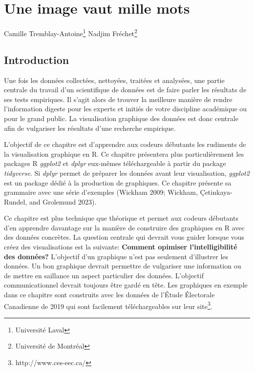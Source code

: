 \documentclass[
  letterpaper,
]{scrbook}
\begin{document}

\hypertarget{une-image-vaut-mille-mots}{%
\chapter{Une image vaut mille mots}\label{une-image-vaut-mille-mots}}

Camille Tremblay-Antoine\footnote{Université Laval} Nadjim
Fréchet\footnote{Université de Montréal}

\hypertarget{introduction-1}{%
\section{Introduction}\label{introduction-1}}

Une fois les données collectées, nettoyées, traitées et analysées, une
partie centrale du travail d'un scientifique de données est de faire
parler les résultats de ses tests empiriques. Il s'agit alors de trouver
la meilleure manière de rendre l'information digeste pour les experts et
initiés de votre discipline académique ou pour le grand public. La
visualisation graphique des données est donc centrale afin de vulgariser
les résultats d'une recherche empirique.

L'objectif de ce chapitre est d'apprendre aux codeurs débutants les
rudiments de la visualisation graphique en R. Ce chapitre présentera
plus particulièrement les packages R \emph{ggplot2} et \emph{dplyr}
eux-mêmes téléchargeable à partir du package \emph{tidyverse}. Si
\emph{dplyr} permet de préparer les données avant leur visualisation,
\emph{ggplot2} est un package dédié à la production de graphiques. Ce
chapitre présente sa grammaire avec une série d'exemples (Wickham 2009;
Wickham, Çetinkaya-Rundel, and Grolemund 2023).

Ce chapitre est plus technique que théorique et permet aux codeurs
débutants d'en apprendre davantage sur la manière de construire des
graphiques en R avec des données concrètes. La question centrale qui
devrait vous guider lorsque vous créez des visualisations est la
suivante: \textbf{Comment opimiser l'intelligibilité des données?}
L'objectif d'un graphique n'est pas seulement d'illustrer les données.
Un bon graphique devrait permettre de vulgariser une information ou de
mettre en saillance un aspect particulier des données. L'objectif
communicationnel devrait toujours être gardé en tête. Les graphiques en
exemple dans ce chapitre sont construits avec les données de l'Étude
Électorale Canadienne de 2019 qui sont facilement téléchargeables sur
leur site\footnote{http://www.ces-eec.ca/}.
\end{document}
